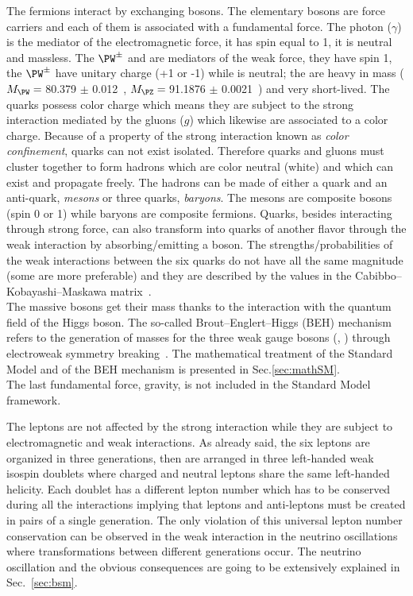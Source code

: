 The fermions interact by exchanging bosons. The elementary bosons are force carriers and each of them is associated with a fundamental force. The photon ($\gamma$) is the mediator of the electromagnetic force, it has spin equal to 1, it is neutral and massless. The $\PW^{\pm}$ and \PZ are mediators of the weak force, they have spin 1, the $\PW^{\pm}$ have unitary charge (+1 or -1) while \PZ is neutral; the are heavy in mass ($M_\PW =\:$80.379 $\pm$ 0.012\GeV~\cite{pdgw}, $M_\PZ =\:$91.1876 $\pm$ 0.0021\GeV~\cite{pdgz}) and very short-lived. The quarks possess color charge which means they are subject to the strong interaction mediated by the gluons ($g$) which likewise are associated to a color charge. Because of a property of the strong interaction known as \emph{color confinement}, quarks can not exist isolated. Therefore quarks and gluons must cluster together to form hadrons which are color neutral (white) and which can exist and propagate freely. The hadrons can be made of either a quark and an anti-quark, \emph{mesons} or three quarks, \emph{baryons}. The mesons are composite bosons (spin 0 or 1) while baryons are composite fermions. Quarks, besides interacting through strong force, can also transform into quarks of another flavor through the weak interaction by absorbing/emitting a \PW boson. The strengths/probabilities of the weak interactions between the six quarks do not have all the same magnitude (some are more preferable) and they are described by the values in the Cabibbo–Kobayashi–Maskawa matrix~\cite{10.1143/PTP.28.870}.\\
The massive bosons get their mass thanks to the interaction with the quantum field of the Higgs boson. The so-called Brout–Englert–Higgs (BEH) mechanism refers to the generation of masses for the three weak gauge bosons (\PW, \PZ) through electroweak symmetry breaking~\cite{PhysRevLett.13.321,PhysRevLett.13.508}. The mathematical treatment of the Standard Model and of the BEH mechanism is presented in Sec.\ref{sec:mathSM}.\\
The last fundamental force, gravity, is not included in the Standard Model framework. 

The leptons are not affected by the strong interaction while they are subject to electromagnetic and weak interactions. As already said, the six leptons are organized in three generations, then are arranged in three left-handed weak isospin doublets where charged and neutral leptons share the same left-handed helicity. Each doublet has a different lepton number which has to be conserved during all the interactions implying that leptons and anti-leptons must be created in pairs of a single generation. The only violation of this universal lepton number conservation can be observed in the weak interaction in the neutrino oscillations where transformations between different generations occur. The neutrino oscillation and the obvious consequences are going to be extensively explained in Sec.~\ref{sec:bsm}. 



